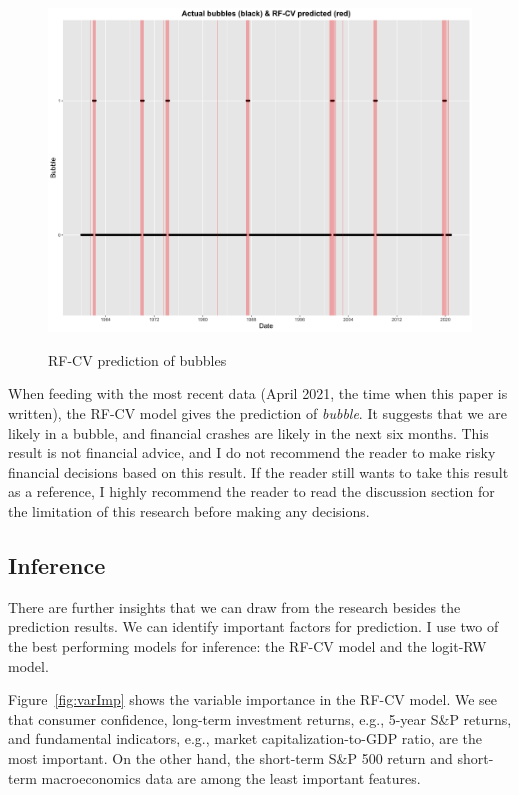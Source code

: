 \documentclass[12pt, man, a4paper, floatsintext]{apa7}
\begin{document}
\begin{figure}
    \centering
    \caption{RF-CV prediction of bubbles}
    \includegraphics[width=15cm]{rfcv_full.png}
    \label{fig:rfcv_full}
\end{figure}

When feeding with the most recent data (April 2021, the time when this paper is written), the RF-CV model gives the prediction of \emph{bubble}. It suggests that we are likely in a bubble, and financial crashes are likely in the next six months. This result is not financial advice, and I do not recommend the reader to make risky financial decisions based on this result. If the reader still wants to take this result as a reference, I highly recommend the reader to read the discussion section for the limitation of this research before making any decisions.

\subsection{Inference}

There are further insights that we can draw from the research besides the prediction results. We can identify important factors for prediction. I use two of the best performing models for inference: the RF-CV model and the logit-RW model. 

Figure~\ref{fig:varImp} shows the variable importance in the RF-CV model. We see that consumer confidence, long-term investment returns, e.g., 5-year S\&P returns, and fundamental indicators, e.g., market capitalization-to-GDP ratio, are the most important. On the other hand, the short-term S\&P 500 return and short-term macroeconomics data are among the least important features.
\end{document}
